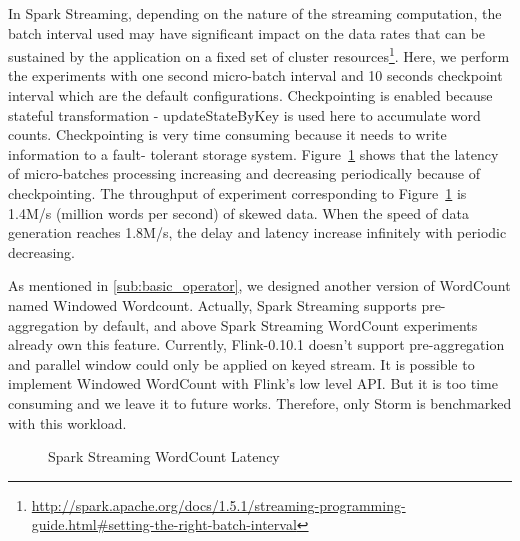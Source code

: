In Spark Streaming, depending on the nature of the streaming computation, the batch interval used may have significant impact on the data rates that can be sustained by the application on a fixed set of cluster resources\footnote{\url{http://spark.apache.org/docs/1.5.1/streaming-programming-guide.html\#setting-the-right-batch-interval}}. Here, we perform the experiments with one second micro-batch interval and 10 seconds checkpoint interval which are the default configurations. Checkpointing is enabled because stateful transformation - updateStateByKey is used here to accumulate word counts.  Checkpointing is very time consuming because it needs to write information to a fault- tolerant storage system. Figure~\ref{fig:spark_wordcount_latency} shows that the latency of micro-batches processing increasing and decreasing periodically because of checkpointing. The throughput of experiment corresponding to Figure~\ref{fig:spark_wordcount_latency} is 1.4M/s (million words per second) of skewed data. When the speed of data generation reaches 1.8M/s, the delay and latency increase infinitely with periodic decreasing.

As mentioned in \cref{sub:basic_operator}, we designed another version of WordCount named Windowed Wordcount. Actually, Spark Streaming supports pre-aggregation by default, and above Spark Streaming WordCount experiments already own this feature. Currently, Flink-0.10.1 doesn't support pre-aggregation and parallel window could only be applied on keyed stream. It is possible to implement Windowed WordCount with Flink's low level API. But it is too time consuming and we leave it to future works. Therefore, only Storm is benchmarked with this workload.

\begin{figure}
  \begin{center}
   \caption{Spark Streaming WordCount Latency}
   \label{fig:spark_wordcount_latency}
  \end{center}
\end{figure}

